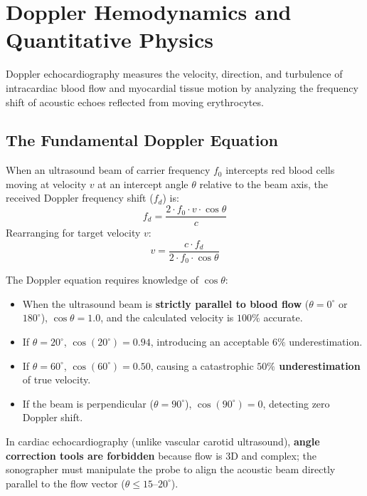 \documentclass[11pt,a4paper]{article}
\begin{document}
\newpage
\section{Doppler Hemodynamics and Quantitative Physics}

Doppler echocardiography measures the velocity, direction, and turbulence of intracardiac blood flow and myocardial tissue motion by analyzing the frequency shift of acoustic echoes reflected from moving erythrocytes.

\subsection{The Fundamental Doppler Equation}

When an ultrasound beam of carrier frequency $f_0$ intercepts red blood cells moving at velocity $v$ at an intercept angle $\theta$ relative to the beam axis, the received Doppler frequency shift ($f_d$) is:
\begin{equation}
    f_d = \frac{2 \cdot f_0 \cdot v \cdot \cos\theta}{c}
\end{equation}
Rearranging for target velocity $v$:
\begin{equation}
    v = \frac{c \cdot f_d}{2 \cdot f_0 \cdot \cos\theta}
\end{equation}

\begin{physicsbox}
The Doppler equation requires knowledge of $\cos\theta$:
\begin{itemize}[leftmargin=*]
    \item When the ultrasound beam is \textbf{strictly parallel to blood flow} ($\theta = 0^\circ$ or $180^\circ$), $\cos\theta = 1.0$, and the calculated velocity is $100\%$ accurate.
    \item If $\theta = 20^\circ$, $\cos(20^\circ) = 0.94$, introducing an acceptable $6\%$ underestimation.
    \item If $\theta = 60^\circ$, $\cos(60^\circ) = 0.50$, causing a catastrophic \textbf{$50\%$ underestimation} of true velocity.
    \item If the beam is perpendicular ($\theta = 90^\circ$), $\cos(90^\circ) = 0$, detecting zero Doppler shift.
\end{itemize}
In cardiac echocardiography (unlike vascular carotid ultrasound), \textbf{angle correction tools are forbidden} because flow is 3D and complex; the sonographer must manipulate the probe to align the acoustic beam directly parallel to the flow vector ($\theta \le 15\text{--}20^\circ$).
\end{physicsbox}
\end{document}
